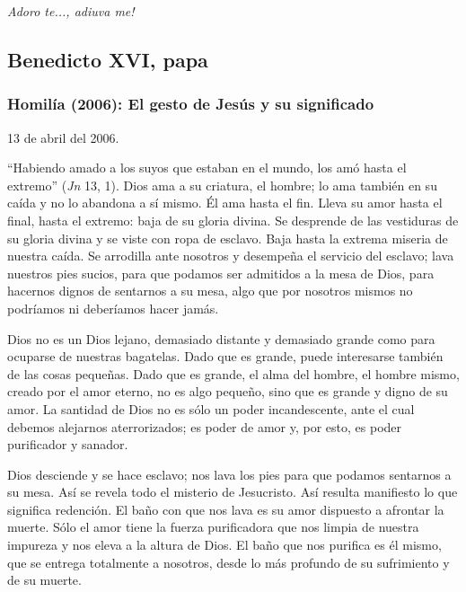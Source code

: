 			\begin{body}\textit{Adoro te..., adiuva me!}\end{body}
			
			\subsection{Benedicto XVI, papa}
			
			\subsubsection{Homilía (2006): El gesto de Jesús y su significado}
			
			\begin{referencia}13 de abril del 2006.\end{referencia}
			
			\begin{body}“Habiendo amado a los suyos que estaban en el mundo, los amó hasta el extremo” (\textit{Jn} 13, 1). Dios ama a su criatura, el hombre; lo ama también en su caída y no lo abandona a sí mismo. Él ama hasta el fin. Lleva su amor hasta el final, hasta el extremo: baja de su gloria divina. Se desprende de las vestiduras de su gloria divina y se viste con ropa de esclavo. Baja hasta la extrema miseria de nuestra caída. Se arrodilla ante nosotros y desempeña el servicio del esclavo; lava nuestros pies sucios, para que podamos ser admitidos a la mesa de Dios, para hacernos dignos de sentarnos a su mesa, algo que por nosotros mismos no podríamos ni deberíamos hacer jamás.\end{body}
			
			\begin{body}Dios no es un Dios lejano, demasiado distante y demasiado grande como para ocuparse de nuestras bagatelas. Dado que es grande, puede interesarse también de las cosas pequeñas. Dado que es grande, el alma del hombre, el hombre mismo, creado por el amor eterno, no es algo pequeño, sino que es grande y digno de su amor. La santidad de Dios no es sólo un poder incandescente, ante el cual debemos alejarnos aterrorizados; es poder de amor y, por esto, es poder purificador y sanador.\end{body}
			
			\begin{body}Dios desciende y se hace esclavo; nos lava los pies para que podamos sentarnos a su mesa. Así se revela todo el misterio de Jesucristo. Así resulta manifiesto lo que significa redención. El baño con que nos lava es su amor dispuesto a afrontar la muerte. Sólo el amor tiene la fuerza purificadora que nos limpia de nuestra impureza y nos eleva a la altura de Dios. El baño que nos purifica es él mismo, que se entrega totalmente a nosotros, desde lo más profundo de su sufrimiento y de su muerte.\end{body}
			
